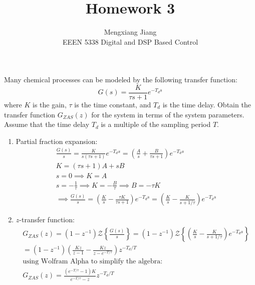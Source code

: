 \documentclass[12pt]{article}
\newenvironment{problem}[2][Problem]{\begin{trivlist}
\item[\hskip \labelsep {\bfseries #1}\hskip \labelsep {\bfseries #2.}]}{\end{trivlist}}
\begin{document}
 
 
\title{Homework 3}%
\author{Mengxiang Jiang\\ %
EEEN 5338 Digital and DSP Based Control} %
 
\maketitle
 
\begin{problem}{1} %
    Many chemical processes can be modeled by the following transfer function:
    $$G(s) = \frac{K}{\tau s+1}e^{-T_{d}s}$$
    where $K$ is the gain, $\tau$ is the time constant, and $T_d$ is the time delay. Obtain the transfer function $G_{ZAS}(z)$ for the system in terms of the system parameters. Assume that the time delay $T_d$ is a multiple of the sampling period $T$.
    \begin{enumerate}[label=\alph*.]
      \item Partial fraction expansion:
      \begin{align*}
        \frac{G(s)}{s} = \frac{K}{s(\tau s+1)}e^{-T_ds} = \left(\frac{A}{s}+\frac{B}{\tau s+1}\right)e^{-T_ds}\\
        K = (\tau s+1)A + sB\\
        s=0\implies K = A\\
        s=-\frac{1}{\tau} \implies K= -\frac{B}{\tau} \implies B = -\tau K\\
        \implies \frac{G(s)}{s} = \left(\frac{K}{s} - \frac{\tau K}{\tau s + 1}\right)e^{-T_ds} = \left(\frac{K}{s} - \frac{K}{s + 1/\tau}\right)e^{-T_ds} 
      \end{align*} 
      \item $z$-transfer function:
      \begin{align*}
        G_{ZAS}(z) = (1-z^{-1})\mathcal{Z}\left\{\frac{G(s)}{s}\right\}=(1-z^{-1})\mathcal{Z}\left\{\left(\frac{K}{s}-\frac{K}{s+1/\tau}\right)e^{-T_ds}\right\}\\
        = (1-z^{-1})\left(\frac{Kz}{z-1}-\frac{Kz}{z-e^{-T/\tau}}\right)z^{-T_d/T}\\
        \text{using Wolfram Alpha to simplify the algebra:}\\
        G_{ZAS}(z)=\frac{(e^{-T/\tau}-1)K}{e^{-T/\tau}-z}z^{-T_d/T}
      \end{align*} 
  \end{enumerate}
\end{problem}
\end{document}
